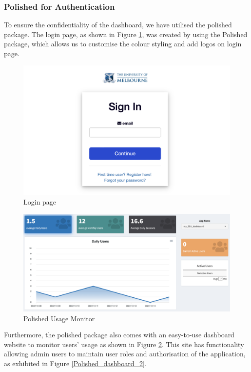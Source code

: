 \documentclass[11pt, oneside]{article}
\begin{document}
\subsubsection{Polished for Authentication}
To ensure the confidentiality of the dashboard, we have utilised the polished package. The login page, as shown in Figure \ref{Login_Homepage}, was created by using the Polished package, which allows us to customise the colour styling and add logos on login page.

\begin{figure}[H]
    \centering
    \includegraphics[scale=0.26]{images/Polished_login.png}
    \caption{Login page}
    \label{Login_Homepage}
\end{figure}

\begin{figure}[H]
    \centering
    \includegraphics[scale=0.35]{images/Polished_1.png}
    \caption{Polished Usage Monitor}
    \label{Polished_dashboard}
\end{figure}

\noindent Furthermore, the polished package also comes with an easy-to-use dashboard website to monitor users' usage as shown in Figure \ref{Polished_dashboard}. This site has functionality allowing admin users to maintain user roles and authorisation of the application, as exhibited in Figure \ref{Polished_dashboard_2}.
\end{document}

